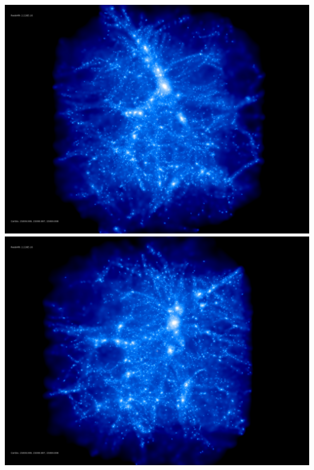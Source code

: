 \includegraphics[scale=0.1]{stages_19/rotate_00074.jpg} 
\includegraphics[scale=0.1]{stages_19/rotate_00131.jpg}

